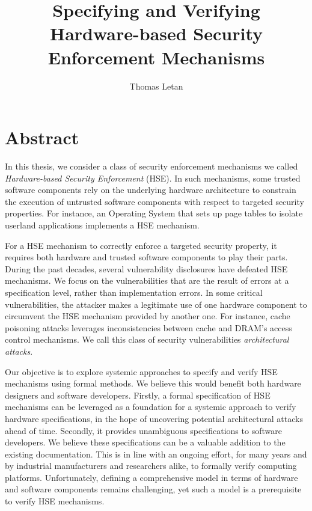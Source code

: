 \documentclass{article}
\title{Specifying and Verifying Hardware-based Security Enforcement Mechanisms}
\author{Thomas Letan}
\date{}
\begin{document}
\maketitle

\section{Abstract}

In this thesis, we consider a class of security enforcement mechanisms we called
\emph{Hardware-based Security Enforcement} (HSE).
%
In such mechanisms, some trusted software components rely on the underlying
hardware architecture to constrain the execution of untrusted software
components with respect to targeted security properties.
%
For instance, an Operating System that sets up page tables to isolate userland
applications implements a HSE mechanism.

For a HSE mechanism to correctly enforce a targeted security property, it
requires both hardware and trusted software components to play their parts.
%
During the past decades, several vulnerability disclosures have defeated HSE
mechanisms.
%
We focus on the vulnerabilities that are the result of errors at a specification
level, rather than implementation errors.
%
In some critical vulnerabilities, the attacker makes a legitimate use of one
hardware component to circumvent the HSE mechanism provided by another one.
%
For instance, cache poisoning attacks leverages inconsistencies between cache
and DRAM's access control mechanisms.
%
We call this class of security vulnerabilities \emph{architectural attacks}.

Our objective is to explore systemic approaches to specify and verify HSE
mechanisms using formal methods.
%
We believe this would benefit both hardware designers and software developers.
%
Firstly, a formal specification of HSE mechanisms can be leveraged as a
foundation for a systemic approach to verify hardware specifications, in the
hope of uncovering potential architectural attacks ahead of time.
%
Secondly, it provides unambiguous specifications to software developers. We
believe these specifications can be a valuable addition to the existing
documentation.
%
This is in line with an ongoing effort, for many years and by industrial
manufacturers and researchers alike, to formally verify computing platforms.
%
Unfortunately, defining a comprehensive model in terms of hardware and software
components remains challenging, yet such a model is a prerequisite to verify HSE
mechanisms.
\end{document}
